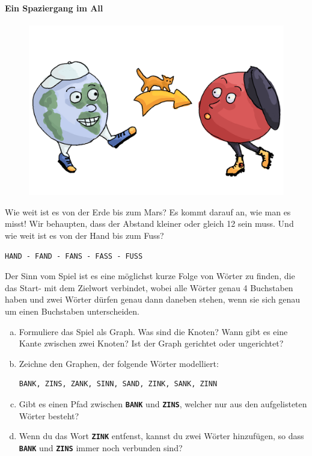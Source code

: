 \paragraph{Ein Spaziergang im All}
\begin{figure}[H]
    \centering
    \includegraphics[width=\textwidth]{Pictures/SP/erde_mars.png}
\end{figure}
Wie weit ist es von der Erde bis zum Mars? Es kommt darauf an, wie man es misst! Wir behaupten, dass der Abstand kleiner oder gleich 12 sein muss. Und wie weit ist es von der Hand bis zum Fuss?
\begin{lstlisting}
HAND - FAND - FANS - FASS - FUSS
\end{lstlisting}
Der Sinn vom Spiel ist es eine möglichst kurze Folge von Wörter zu finden, die das Start- mit dem Zielwort verbindet, wobei alle Wörter genau 4 Buchstaben haben und zwei Wörter dürfen genau dann daneben stehen, wenn sie sich genau um einen Buchstaben unterscheiden.


\begin{aufgabe}
\begin{enumerate}[(a)]\label{aufgabe_erde_mars_graph}
    \item Formuliere das Spiel als Graph. Was sind die Knoten? Wann gibt es eine Kante zwischen zwei Knoten? Ist der Graph gerichtet oder ungerichtet?
    \item Zeichne den Graphen, der folgende Wörter modelliert:
\begin{lstlisting}
BANK, ZINS, ZANK, SINN, SAND, ZINK, SANK, ZINN
\end{lstlisting}
    \item Gibt es einen Pfad zwischen \textbf{\texttt{BANK}} und \textbf{\texttt{ZINS}}, welcher nur aus den aufgelisteten Wörter besteht?
    \item Wenn du das Wort \textbf{\texttt{ZINK}} entfenst, kannst du zwei Wörter hinzufügen, so dass \textbf{\texttt{BANK}} und \textbf{\texttt{ZINS}} immer noch verbunden sind?
\end{enumerate}

\end{aufgabe}

